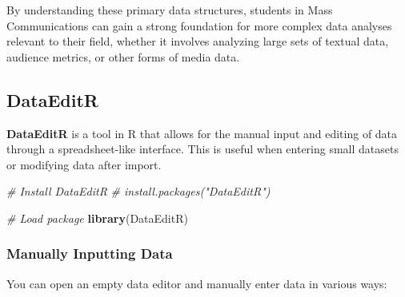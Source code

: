 \documentclass[
]{book}
\newenvironment{Shaded}{\begin{snugshade}}{\end{snugshade}}
\newcommand{\CommentTok}[1]{\textcolor[rgb]{0.56,0.35,0.01}{\textit{#1}}}
\newcommand{\FunctionTok}[1]{\textcolor[rgb]{0.13,0.29,0.53}{\textbf{#1}}}
\newcommand{\NormalTok}[1]{#1}
\newcommand{\OtherTok}[1]{\textcolor[rgb]{0.56,0.35,0.01}{#1}}
\newcommand{\SpecialCharTok}[1]{\textcolor[rgb]{0.81,0.36,0.00}{\textbf{#1}}}
\newcommand{\StringTok}[1]{\textcolor[rgb]{0.31,0.60,0.02}{#1}}
\begin{document}
\begin{Shaded}
\end{Shaded}

By understanding these primary data structures, students in Mass Communications can gain a strong foundation for more complex data analyses relevant to their field, whether it involves analyzing large sets of textual data, audience metrics, or other forms of media data.

\subsection*{DataEditR}\label{dataeditr}

\textbf{DataEditR} is a tool in R that allows for the manual input and editing of data through a spreadsheet-like interface. This is useful when entering small datasets or modifying data after import.

\begin{Shaded}
\begin{Highlighting}[]
\CommentTok{\# Install DataEditR}
\CommentTok{\# install.packages("DataEditR")}

\CommentTok{\# Load package}
\FunctionTok{library}\NormalTok{(DataEditR)}
\end{Highlighting}
\end{Shaded}

\subsubsection*{Manually Inputting Data}\label{manually-inputting-data-1}

You can open an empty data editor and manually enter data in various ways:
\end{document}
